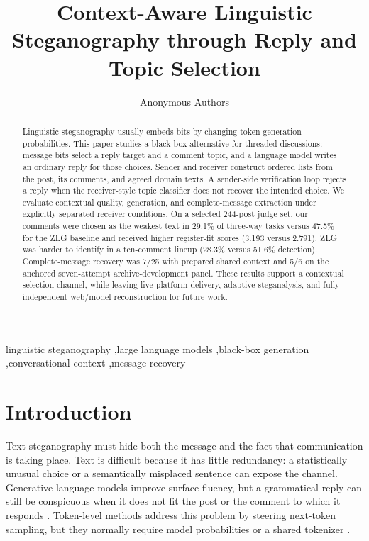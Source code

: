 \documentclass[3p,times,procedia]{elsarticle}
\begin{document}
\begin{frontmatter}

\title{Context-Aware Linguistic Steganography through Reply and Topic Selection}

\author{Anonymous Authors}
\address{Anonymous submission}

\begin{abstract}
Linguistic steganography usually embeds bits by changing token-generation probabilities. This paper studies a black-box alternative for threaded discussions: message bits select a reply target and a comment topic, and a language model writes an ordinary reply for those choices. Sender and receiver construct ordered lists from the post, its comments, and agreed domain texts. A sender-side verification loop rejects a reply when the receiver-style topic classifier does not recover the intended choice. We evaluate contextual quality, generation, and complete-message extraction under explicitly separated receiver conditions. On a selected 244-post judge set, our comments were chosen as the weakest text in 29.1\% of three-way tasks versus 47.5\% for the ZLG baseline and received higher register-fit scores (3.193 versus 2.791). ZLG was harder to identify in a ten-comment lineup (28.3\% versus 51.6\% detection). Complete-message recovery was 7/25 with prepared shared context and 5/6 on the anchored seven-attempt archive-development panel. These results support a contextual selection channel, while leaving live-platform delivery, adaptive steganalysis, and fully independent web/model reconstruction for future work.
\end{abstract}

\begin{keyword}
linguistic steganography \sep large language models \sep black-box generation \sep conversational context \sep message recovery
\end{keyword}
\end{frontmatter}

\section{Introduction}

Text steganography must hide both the message and the fact that communication is taking place. Text is difficult because it has little redundancy: a statistically unusual choice or a semantically misplaced sentence can expose the channel. Generative language models improve surface fluency, but a grammatical reply can still be conspicuous when it does not fit the post or the comment to which it responds \citep{ding2023context,liao2024co,wang2023hi}. Token-level methods address this problem by steering next-token sampling, but they normally require model probabilities or a shared tokenizer \citep{zhang2021provably,kaptchuk2021meteor}.
\end{document}
